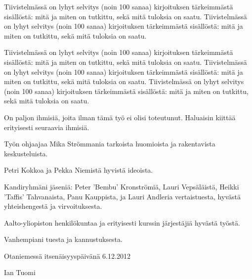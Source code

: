 \documentclass[finnish,12pt]{article}
\author{Ian Tuomi}{}
\date{5.12.2012}
\begin{document}
	 \makecoverpage

	\begin{abstractpage}[finnish]
  
    Tiivistelmässä on lyhyt selvitys (noin 100 sanaa)
  kirjoituksen tärkeimmästä sisällöstä: mitä ja miten on tutkittu,
  sekä mitä tuloksia on saatu. 
  Tiivistelmässä on lyhyt selvitys (noin 100 sanaa)
  kirjoituksen tärkeimmästä sisällöstä: mitä ja miten on tutkittu,
  sekä mitä tuloksia on saatu. 

  Tiivistelmässä on lyhyt selvitys (noin 100 sanaa)
  kirjoituksen tärkeimmästä sisällöstä: mitä ja miten on tutkittu,
  sekä mitä tuloksia on saatu. 
  Tiivistelmässä on lyhyt selvitys (noin 100 sanaa)
  kirjoituksen tärkeimmästä sisällöstä: mitä ja miten on tutkittu,
  sekä mitä tuloksia on saatu. 
  Tiivistelmässä on lyhyt selvitys (noin 100 sanaa)
  kirjoituksen tärkeimmästä sisällöstä: mitä ja miten on tutkittu,
  sekä mitä tuloksia on saatu. 

	\end{abstractpage}

	\newpage


On paljon ihmisiä, joita ilman tämä työ ei olisi toteutunut.
Haluaisin kiittää erityisesti seuraavia ihmisiä.

Työn ohjaajaa Mika Strömmania tarkoista huomioista ja rakentavista keskusteluista.

Petri Kokkoa ja Pekka Niemistä hyvistä ideoista.

Kandiryhmäni jäseniä:
Peter 'Bembu' Kronströmiä, Lauri Vepsäläistä, Heikki 'Taffis' Tahvanaista, Panu Kauppista, ja Lauri Andleria vertaistuesta, hyvästä yhteishengestä ja virvoituksesta.

Aalto-yliopiston henkilökuntaa ja erityisesti kurssin järjestäjiä hyvästä työstä.

Vanhempiani tuesta ja kannustuksesta.

	\vspace{5cm}

Otaniemessä itsenäisyyspäivänä 6.12.2012

\vspace{5mm}
	{\hfill Ian Tuomi \hspace{1cm}}

	\newpage

	\tableofcontents
\end{document}
